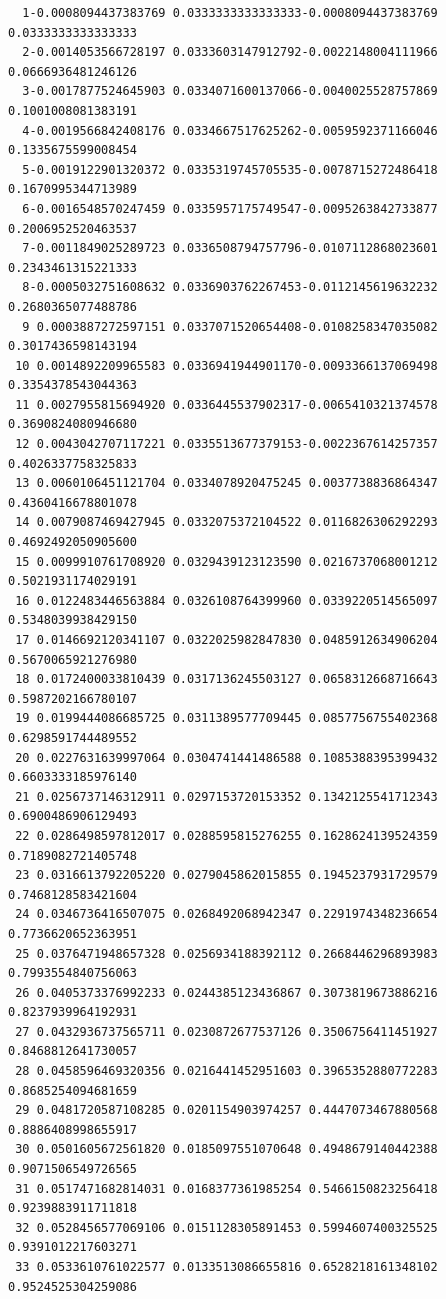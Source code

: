 \begin{verbatim}
  1-0.0008094437383769 0.0333333333333333-0.0008094437383769 0.0333333333333333
  2-0.0014053566728197 0.0333603147912792-0.0022148004111966 0.0666936481246126
  3-0.0017877524645903 0.0334071600137066-0.0040025528757869 0.1001008081383191
  4-0.0019566842408176 0.0334667517625262-0.0059592371166046 0.1335675599008454
  5-0.0019122901320372 0.0335319745705535-0.0078715272486418 0.1670995344713989
  6-0.0016548570247459 0.0335957175749547-0.0095263842733877 0.2006952520463537
  7-0.0011849025289723 0.0336508794757796-0.0107112868023601 0.2343461315221333
  8-0.0005032751608632 0.0336903762267453-0.0112145619632232 0.2680365077488786
  9 0.0003887272597151 0.0337071520654408-0.0108258347035082 0.3017436598143194
 10 0.0014892209965583 0.0336941944901170-0.0093366137069498 0.3354378543044363
 11 0.0027955815694920 0.0336445537902317-0.0065410321374578 0.3690824080946680
 12 0.0043042707117221 0.0335513677379153-0.0022367614257357 0.4026337758325833
 13 0.0060106451121704 0.0334078920475245 0.0037738836864347 0.4360416678801078
 14 0.0079087469427945 0.0332075372104522 0.0116826306292293 0.4692492050905600
 15 0.0099910761708920 0.0329439123123590 0.0216737068001212 0.5021931174029191
 16 0.0122483446563884 0.0326108764399960 0.0339220514565097 0.5348039938429150
 17 0.0146692120341107 0.0322025982847830 0.0485912634906204 0.5670065921276980
 18 0.0172400033810439 0.0317136245503127 0.0658312668716643 0.5987202166780107
 19 0.0199444086685725 0.0311389577709445 0.0857756755402368 0.6298591744489552
 20 0.0227631639997064 0.0304741441486588 0.1085388395399432 0.6603333185976140
 21 0.0256737146312911 0.0297153720153352 0.1342125541712343 0.6900486906129493
 22 0.0286498597812017 0.0288595815276255 0.1628624139524359 0.7189082721405748
 23 0.0316613792205220 0.0279045862015855 0.1945237931729579 0.7468128583421604
 24 0.0346736416507075 0.0268492068942347 0.2291974348236654 0.7736620652363951
 25 0.0376471948657328 0.0256934188392112 0.2668446296893983 0.7993554840756063
 26 0.0405373376992233 0.0244385123436867 0.3073819673886216 0.8237939964192931
 27 0.0432936737565711 0.0230872677537126 0.3506756411451927 0.8468812641730057
 28 0.0458596469320356 0.0216441452951603 0.3965352880772283 0.8685254094681659
 29 0.0481720587108285 0.0201154903974257 0.4447073467880568 0.8886408998655917
 30 0.0501605672561820 0.0185097551070648 0.4948679140442388 0.9071506549726565
 31 0.0517471682814031 0.0168377361985254 0.5466150823256418 0.9239883911711818
 32 0.0528456577069106 0.0151128305891453 0.5994607400325525 0.9391012217603271
 33 0.0533610761022577 0.0133513086655816 0.6528218161348102 0.9524525304259086

\end{verbatim}
